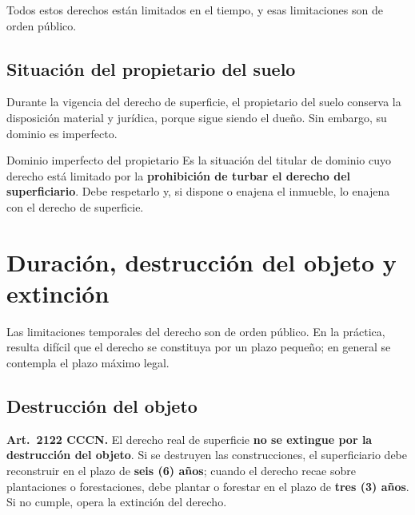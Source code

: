\documentclass[12pt,oneside]{book}
\begin{document}
\begin{important}
Todos estos derechos están limitados en el tiempo, y esas limitaciones son de orden público.
\end{important}

\subsection{Situación del propietario del suelo}

Durante la vigencia del derecho de superficie, el propietario del suelo conserva la disposición material y jurídica, porque sigue siendo el dueño. Sin embargo, su dominio es imperfecto.

\begin{definition}{Dominio imperfecto del propietario}
Es la situación del titular de dominio cuyo derecho está limitado por la \textbf{prohibición de turbar el derecho del superficiario}. Debe respetarlo y, si dispone o enajena el inmueble, lo enajena con el derecho de superficie.
\end{definition}

\section{Duración, destrucción del objeto y extinción}

Las limitaciones temporales del derecho son de orden público. En la práctica, resulta difícil que el derecho se constituya por un plazo pequeño; en general se contempla el plazo máximo legal.

\subsection{Destrucción del objeto}

\begin{important}
\textbf{Art.~2122 CCCN.} El derecho real de superficie \textbf{no se extingue por la destrucción del objeto}. Si se destruyen las construcciones, el superficiario debe reconstruir en el plazo de \textbf{seis (6) años}; cuando el derecho recae sobre plantaciones o forestaciones, debe plantar o forestar en el plazo de \textbf{tres (3) años}. Si no cumple, opera la extinción del derecho.
\end{important}
\end{document}

